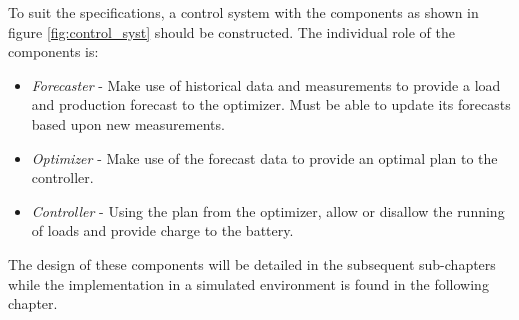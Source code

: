 
To suit the specifications, a control system with the components as shown in figure \ref{fig:control_syst} should be constructed. The individual role of the components is:
\begin{itemize}
    \item \textit{Forecaster}   -   Make use of historical data and measurements to provide a load and production forecast to the optimizer. Must be able to update its forecasts based upon new measurements.
    \item \textit{Optimizer}    -   Make use of the forecast data to provide an optimal plan to the controller.
    \item \textit{Controller}   -   Using the plan from the optimizer, allow or disallow the running of loads and provide charge to the battery.
\end{itemize}

The design of these components will be detailed in the subsequent sub-chapters while the implementation in a simulated environment is found in the following chapter.

